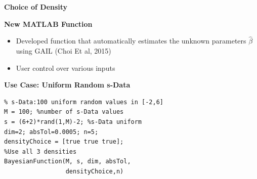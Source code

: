 \documentclass[final,mathserif]{beamer}
\newcommand{\blue}[1]{{\color{myblue}#1}}
\renewcommand{\blue}{\textcolor{blue!80!black}}
\begin{document}
\begin{frame}[fragile]
\begin{columns}[t]
\begin{column}{.31\linewidth}
\begin{block}{\Large \textbf{\blue {Choice of Density}}}
\begin{itemize}
\end{itemize}
\end{block}

\vspace{0.1in}

\begin{block}{\Large \textbf{\blue {New MATLAB Function}}}
\vspace{.1in}
\begin{itemize}

\item Developed  \alert{function}  that \alert{automatically} estimates the unknown parameters $\hat{\beta}$ using GAIL (Choi Et al, 2015)  

\item User control over various inputs

\end{itemize}
\end{block}

\vspace{0.1in}

\begin{block}{\Large \textbf{\blue {Use Case: Uniform Random s-Data}}}

\vspace{0.1in}    

\lstset{basicstyle=\small} 
\begin{lstlisting} 
% s-Data:100 uniform random values in [-2,6] 
M = 100; %number of s-Data values
s = (6+2)*rand(1,M)-2; %s-Data uniform
dim=2; absTol=0.0005; n=5;
densityChoice = [true true true]; 
%Use all 3 densities
BayesianFunction(M, s, dim, absTol, 
                 densityChoice,n)
\end{lstlisting}    

\begin{center}
\end{center}


\end{block}
\end{column}
\end{columns}
\end{frame}
\end{document}
